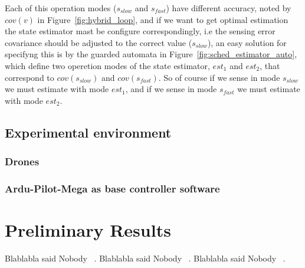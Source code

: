 \documentclass[11pt]{article}
\begin{document}
Each of this operation modes ($s_{slow}$ and $s_{fast}$) have different accuracy, noted by $cov(v)$ in Figure~\ref{fig:hybrid_loop}, and if we want to get optimal estimation the state estimator mast be configure correspondingly, i.e the sensing error covariance should be adjusted to the correct value ($s_{slow}$), an easy solution for specifyng this is by the guarded automata in Figure~\ref{fig:sched_estimator_auto}, which define two operetion modes of the state estimator, $est_1$ and $est_2$, that correspond to $cov(s_{slow})$ and $cov(s_{fast})$. So of course if we sense in mode $s_{slow}$ we must estimate with mode $est_1$, and if we sense in mode $s_{fast}$ we must estimate with mode $est_2$.





\subsection{Experimental environment}
\label{sec:enviroment}
\subsubsection{Drones}
\label{sec:drones}
\subsubsection{Ardu-Pilot-Mega as base controller software}
\label{sec:APM}

\section{Preliminary Results}
\label{sec:results}
Blablabla said Nobody ~\cite{Merav}.
Blablabla said Nobody ~\cite{APM}.
Blablabla said Nobody ~\cite{RTComposer}.



    
    {}
\end{document}
